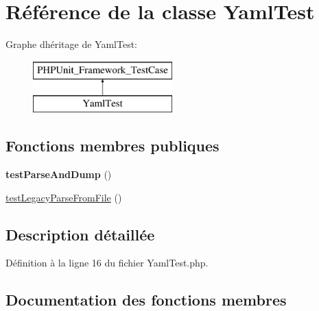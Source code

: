 \hypertarget{class_symfony_1_1_component_1_1_yaml_1_1_tests_1_1_yaml_test}{}\section{Référence de la classe Yaml\+Test}
\label{class_symfony_1_1_component_1_1_yaml_1_1_tests_1_1_yaml_test}
Graphe d\textquotesingle{}héritage de Yaml\+Test\+:\begin{figure}[H]
\begin{center}
\leavevmode
\includegraphics[height=2.000000cm]{class_symfony_1_1_component_1_1_yaml_1_1_tests_1_1_yaml_test}
\end{center}
\end{figure}
\subsection*{Fonctions membres publiques}
\begin{DoxyCompactItemize}
\item 
{\bfseries test\+Parse\+And\+Dump} ()\hypertarget{class_symfony_1_1_component_1_1_yaml_1_1_tests_1_1_yaml_test_aa4b0f9bbd68ce5dfd5762103d00c7e23}{}\label{class_symfony_1_1_component_1_1_yaml_1_1_tests_1_1_yaml_test_aa4b0f9bbd68ce5dfd5762103d00c7e23}

\item 
\hyperlink{class_symfony_1_1_component_1_1_yaml_1_1_tests_1_1_yaml_test_ab2c2f6f4cbc4475c09a8096de869340a}{test\+Legacy\+Parse\+From\+File} ()
\end{DoxyCompactItemize}


\subsection{Description détaillée}


Définition à la ligne 16 du fichier Yaml\+Test.\+php.



\subsection{Documentation des fonctions membres}
